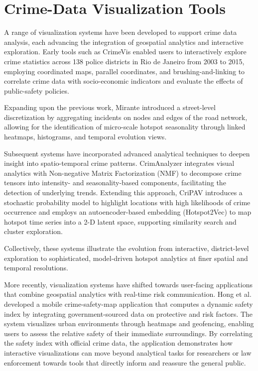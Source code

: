 \section{Crime-Data Visualization Tools}


A range of visualization systems have been developed to support crime data analysis, each advancing the integration of geospatial analytics and interactive exploration. Early tools such as CrimeVis \citep{Silva2017CrimeVisAI} enabled users to interactively explore crime statistics across 138 police districts in Rio de Janeiro from 2003 to 2015, employing coordinated maps, parallel coordinates, and brushing-and-linking to correlate crime data with socio-economic indicators and evaluate the effects of public-safety policies. 

Expanding upon the previous work, Mirante \citep{Garcia2020MiranteAV} introduced a street-level discretization by aggregating incidents on nodes and edges of the road network, allowing for the identification of micro-scale hotspot seasonality through linked heatmaps, histograms, and temporal evolution views.

Subsequent systems have incorporated advanced analytical techniques to deepen insight into spatio-temporal crime patterns. CrimAnalyzer \citep{Garcia2021CrimAnalyzer} integrates visual analytics with Non-negative Matrix Factorization (NMF) to decompose crime tensors into intensity- and seasonality-based components, facilitating the detection of underlying trends. Extending this approach, CriPAV \citep{Garcia2022CriPAV} introduces a stochastic probability model to highlight locations with high likelihoods of crime occurrence and employs an autoencoder-based embedding (Hotspot2Vec) to map hotspot time series into a 2-D latent space, supporting similarity search and cluster exploration. 

Collectively, these systems illustrate the evolution from interactive, district-level exploration to sophisticated, model-driven hotspot analytics at finer spatial and temporal resolutions.

More recently, visualization systems have shifted towards user-facing applications that combine geospatial analytics with real-time risk communication. Hong et al. \citep{mti9020016} developed a mobile crime-safety-map application that computes a dynamic safety index by integrating government-sourced data on protective and risk factors. The system visualizes urban environments through heatmaps and geofencing, enabling users to assess the relative safety of their immediate surroundings. By correlating the safety index with official crime data, the application demonstrates how interactive visualizations can move beyond analytical tasks for researchers or law enforcement towards tools that directly inform and reassure the general public.




